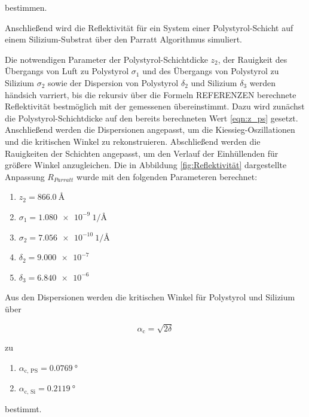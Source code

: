     bestimmen.

    Anschließend wird die Reflektivität für ein System einer Polystyrol-Schicht auf einem Silizium-Substrat über den Parratt Algorithmus simuliert.
    
    
    Die notwendigen Parameter der Polystyrol-Schichtdicke $z_2$, der Rauigkeit des Übergangs von Luft zu Polystyrol $\sigma_1$ und des Übergangs von Polystyrol zu Silizium $\sigma_2$ sowie der Dispersion von
    Polystyrol $\delta_2$ und Silizium $\delta_3$ werden händsich varriert, bis die rekursiv über die Formeln REFERENZEN berechnete Reflektivität bestmöglich mit der gemessenen übereinstimmt. Dazu wird 
    zunächst die Polystyrol-Schichtdicke auf den bereits berechneten Wert \ref{eqn:z_ps} gesetzt. Anschließend werden die Dispersionen angepasst, um die Kiessieg-Oszillationen und die kritischen Winkel
    zu rekonstruieren. Abschließend werden die Rauigkeiten der Schichten angepasst, um den Verlauf der Einhüllenden für größere Winkel anzugleichen. Die in Abbildung \ref{fig:Reflektivität} dargestellte 
    Anpassung $R_{Parratt}$ wurde mit den folgenden Parameteren berechnet:
    
    \begin{enumerate}
      \item $z_2=\SI{866.0}{\angstrom}$
      \item $\sigma_1=\SI{1.080e-9}{1\per\angstrom}$
      \item $\sigma_2=\SI{7.056e-10}{1\per\angstrom}$
      \item $\delta_2=\SI{9.000e-7}{}$
      \item $\delta_3=\SI{6.840e-6}{}$
    \end{enumerate}

    Aus den Dispersionen werden die kritischen Winkel für Polystyrol und Silizium über

    \begin{equation*}
      \alpha_{\text{c}} = \sqrt{2\delta}
    \end{equation*}

    zu

    \begin{enumerate}
      \item $\alpha_{\text{c, PS}} = \SI{0.0769}{\degree}$
      \item $\alpha_{\text{c, Si}} = \SI{0.2119}{\degree}$
    \end{enumerate}
    
    bestimmt.